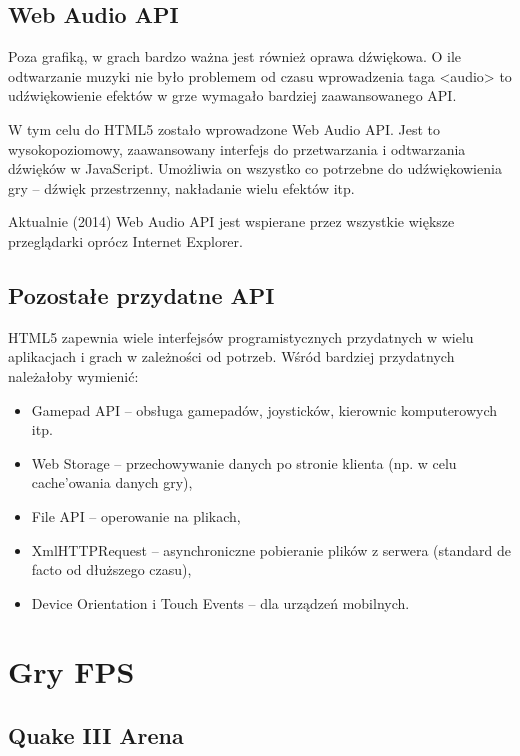\subsection{Web Audio API}
\label{ssec:webAudio}

Poza grafiką, w grach bardzo ważna jest również oprawa dźwiękowa. O ile odtwarzanie muzyki
nie było problemem od czasu wprowadzenia taga <audio> to udźwiękowienie efektów w grze
wymagało bardziej zaawansowanego API.

W tym celu do HTML5 zostało wprowadzone Web Audio API. Jest to wysokopoziomowy, zaawansowany
interfejs do przetwarzania i odtwarzania dźwięków w JavaScript. Umożliwia on wszystko co
potrzebne do udźwiękowienia gry -- dźwięk przestrzenny, nakładanie wielu efektów itp.

Aktualnie (2014) Web Audio API jest wspierane przez wszystkie większe przeglądarki oprócz
Internet Explorer.

\subsection{Pozostałe przydatne API}
\label{ssec:pozostaleApi}

HTML5 zapewnia wiele interfejsów programistycznych przydatnych w wielu aplikacjach
i grach w zależności od potrzeb. Wśród bardziej przydatnych należałoby wymienić:
\begin{itemize}
\item Gamepad API -- obsługa gamepadów, joysticków, kierownic komputerowych itp.
\item Web Storage -- przechowywanie danych po stronie klienta (np. w celu cache'owania danych gry),
\item File API -- operowanie na plikach,
\item XmlHTTPRequest -- asynchroniczne pobieranie plików z serwera (standard de facto
  od dłuższego czasu),
\item Device Orientation i Touch Events -- dla urządzeń mobilnych.
\end{itemize}


\section{Gry FPS}
\label{sec:gryFPS}

\subsection{Quake III Arena}
\label{ssec:quake3}


